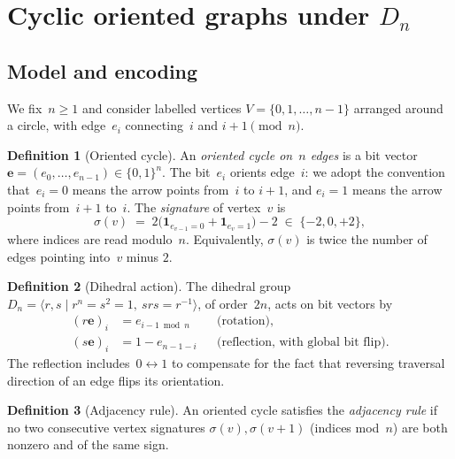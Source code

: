 \documentclass[11pt,a4paper]{article}
\theoremstyle{definition}
\newtheorem{definition}{Definition}[section]
\theoremstyle{plain}
\newcommand{\Dn}{D_{n}}
\begin{document}
\section{Cyclic oriented graphs under $\Dn$}
\label{sec:cyclic}

\subsection{Model and encoding}

We fix~$n\ge 1$ and consider labelled vertices $V = \{0, 1, \dots, n-1\}$
arranged around a circle, with edge~$e_i$ connecting~$i$ and $i+1 \pmod n$.

\begin{definition}[Oriented cycle]\label{def:cycle}
An \emph{oriented cycle on~$n$ edges} is a bit vector~$\mathbf{e} =
(e_0, \dots, e_{n-1}) \in \{0,1\}^n$.  The bit~$e_i$ orients edge~$i$: we
adopt the convention that~$e_i = 0$ means the arrow points from~$i$ to
$i{+}1$, and $e_i = 1$ means the arrow points from~$i{+}1$ to~$i$.  The
\emph{signature} of vertex~$v$ is
\begin{equation}
\label{eq:sig}
\sigma(v) \;=\; 2\bigl(\mathbf{1}_{e_{v-1} = 0} + \mathbf{1}_{e_v = 1}\bigr) - 2
\;\in\; \{-2, 0, +2\},
\end{equation}
where indices are read modulo~$n$.  Equivalently, $\sigma(v)$ is twice
the number of edges pointing into~$v$ minus $2$.
\end{definition}

\begin{definition}[Dihedral action]
The dihedral group~$\Dn = \langle r, s \mid r^n = s^2 = 1,\ srs = r^{-1}
\rangle$, of order~$2n$, acts on bit vectors by
\begin{align*}
(r\mathbf{e})_i &= e_{i-1 \bmod n} && \text{(rotation)},\\
(s\mathbf{e})_i &= 1 - e_{n-1-i}   && \text{(reflection, with global bit flip)}.
\end{align*}
The reflection includes~$0 \leftrightarrow 1$ to compensate for the fact
that reversing traversal direction of an edge flips its orientation.
\end{definition}

\begin{definition}[Adjacency rule]
An oriented cycle satisfies the \emph{adjacency rule} if no two
consecutive vertex signatures $\sigma(v), \sigma(v+1)$ (indices mod~$n$)
are both nonzero and of the same sign.
\end{definition}
\end{document}
